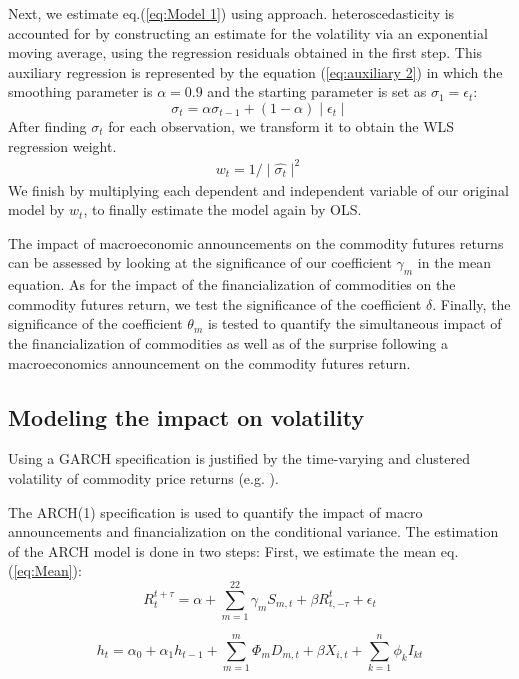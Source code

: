 \documentclass[12pt]{article}
\begin{document}
Next, we estimate eq.(\ref{eq:Model 1}) using\citet{kurov2019price} approach. heteroscedasticity is accounted for by constructing an estimate for the volatility via an exponential moving average, using the regression residuals obtained in the first step. This auxiliary regression is represented by the equation (\ref{eq:auxiliary 2}) in which the smoothing parameter is $\alpha=0.9$ and the starting parameter is set as $\sigma_1=\epsilon_t$:
\begin{equation}\label{eq:auxiliary 2}
\sigma_t=\alpha \sigma_{t-1}+(1-\alpha) \mid \epsilon_t \mid 
\end{equation} 
After finding $\sigma_t$ for each observation, we transform it to obtain the WLS regression weight.
\begin{align*}
w_t=1/\mid \hat{\sigma_t} \mid^2
\end{align*}
We finish by multiplying each dependent and independent variable of our original model by $w_t$, to finally estimate the model again by OLS.

 The impact of macroeconomic announcements on the commodity futures returns  can be assessed by looking at the significance of our coefficient $\gamma_m$ in the mean equation. As for the impact of the financialization of commodities on the commodity futures return, we test the significance of the coefficient $\delta$. Finally, the significance of the coefficient $\theta_m$ is tested to quantify the simultaneous impact of the financialization of commodities as well as of the surprise following a macroeconomics announcement on the commodity futures return.
 
\subsection{Modeling the impact on volatility}\label{variance}
Using a GARCH specification is justified by the time-varying and clustered volatility of commodity price returns (e.g. \citep{hammoudeh2008metal}).

The ARCH(1) specification is used to quantify the impact of macro announcements and financialization on the conditional variance. The estimation of the ARCH model is done in two steps: First, we estimate the mean eq. (\ref{eq:Mean}):
\begin{equation}\label{eq:Mean}R_{t}^{t+\tau}=\alpha+\sum_{m=1}^{22} \gamma_m S_{m,t}+\beta R_{t,-\tau}^{t}+\epsilon_{t}
\end{equation}


\begin{equation}\label{eq:Variance}
h_{t}=\alpha_0+\alpha_1 h_{t-1}+\sum_{m=1}^m \Phi_m D_{m,t}+\beta X_{i,t}+\sum_{k=1}^n \phi_k I_{kt}
\end{equation}
\end{document}
